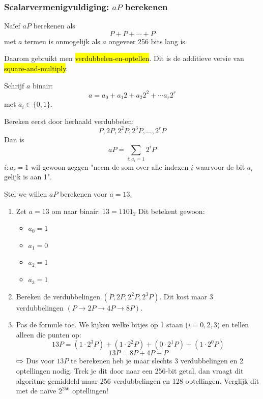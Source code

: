 \subsubsection{Scalarvermenigvuldiging: \texorpdfstring{$aP$}{aP} berekenen}\label{sec:l8_aP-berekenen}

Naïef $aP$ berekenen als
\begin{equation*}
    P + P + \cdots + P
\end{equation*}
met $a$ termen is onmogelijk als $a$ ongeveer 256 bits lang is.

Daarom gebruikt men \hl{verdubbelen-en-optellen}. Dit is de additieve versie van \hl{square-and-multiply}.

Schrijf $a$ binair:
\begin{equation*}
    a = a_0 + a_1 2 + a_2 2^2 + \cdots a_r 2^r
\end{equation*}
met $a_i \in \{0,1\}$.

Bereken eerst door herhaald verdubbelen:
\begin{equation*}
    P, 2P, 2^2P, 2^3P, \dots, 2^rP
\end{equation*}
Dan is
\begin{equation*}
    aP = \sum_{i:a_i = 1}2^iP
\end{equation*}
$i:a_i = 1$ wil gewoon zeggen "neem de som over alle indexen $i$ waarvoor de bit $a_i$ gelijk is aan 1".

\textbf{} Stel we willen $aP$ berekenen voor $a=13$.
\begin{enumerate}
    \item Zet $a=13$ om naar binair: $13 = 1101_2$\newline
    Dit betekent gewoon:
    \begin{itemize}
        \item $a_0 = 1$
        \item $a_1 = 0$
        \item $a_2 = 1$
        \item $a_3 = 1$
    \end{itemize}
    \item Bereken de verdubbelingen $(P, 2P, 2^2P, 2^3P)$. \newline
    Dit kost maar 3 verdubbelingen $(P\to2P\to4P\to8P)$.
    \item Pas de formule toe. We kijken welke bitjes op 1 staan ($i=0,2,3$) en tellen alleen die punten op:
    \begin{equation*}
        13P = (1 \cdot 2^3P) + (1 \cdot 2^2P) + (0 \cdot 2^1P) + (1 \cdot 2^0P)
    \end{equation*}
    \begin{equation*}
        13P = 8P + 4P + P
    \end{equation*}
    $\rightwhitearrow$ Dus voor $13P$ te berekenen heb je maar slechts 3 verdubbelingen en 2 optellingen nodig. Trek je dit door naar een 256-bit getal, dan vraagt dit algoritme gemiddeld maar 256 verdubbelingen en 128 optellingen. Verglijk dit met de naïve $2^{256}$ optellingen!
\end{enumerate}

